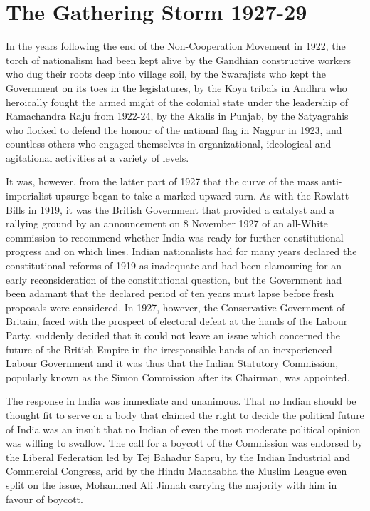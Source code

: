 \chapter{The Gathering Storm 1927-29}



In the years following the end of the Non-Cooperation Movement in 1922, the torch of nationalism had been kept alive by the Gandhian constructive workers who dug their roots deep into village soil, by the Swarajists who kept the Government on its toes in the legislatures, by the Koya tribals in Andhra who heroically fought the armed might of the colonial state under the leadership of Ramachandra Raju from 1922-24, by the Akalis in Punjab, by the Satyagrahis who flocked to defend the honour of the national flag in Nagpur in 1923, and countless others who engaged themselves in organizational, ideological and agitational activities at a variety of levels. 

It was, however, from the latter part of 1927 that the curve of the mass anti-imperialist upsurge began to take a marked upward turn. As with the Rowlatt Bills in 1919, it was the British Government that provided a catalyst and a rallying ground by an announcement on 8 November 1927 of an all-White commission to recommend whether India was ready for further constitutional progress and on which lines. Indian nationalists had for many years declared the constitutional reforms of 1919 as inadequate and had been clamouring for an early reconsideration of the constitutional question, but the Government had been adamant that the declared period of ten years must lapse before fresh proposals were considered. In 1927, however, the Conservative Government of Britain, faced with the prospect of electoral defeat at the hands of the Labour Party, suddenly decided that it could not leave an issue which concerned the future of the British Empire in the irresponsible hands of an inexperienced Labour Government and it was thus that the Indian Statutory Commission, popularly known as the Simon Commission after its Chairman, was appointed. 

The response in India was immediate and unanimous. That no Indian should be thought fit to serve on a body that claimed the right to decide the political future of India was an insult that no Indian of even the most moderate political opinion was willing to swallow. The call for a boycott of the Commission was endorsed by the Liberal Federation led by Tej Bahadur Sapru, by the Indian Industrial and Commercial Congress, arid by the Hindu Mahasabha the Muslim League even split on the issue, Mohammed Ali Jinnah carrying the majority with him in favour of boycott. 

